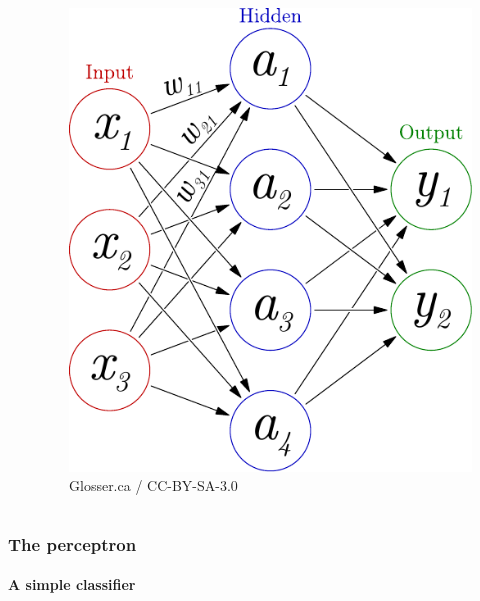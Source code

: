 \documentclass{beamer}
\begin{document}
\begin{frame}
\begin{columns}[T]
\begin{column}{.5\textwidth}
    \end{column}
    \begin{column}{.5\textwidth}
\begin{figure}
 \centering
 \includegraphics[width=\linewidth]{./fig/3-layer_maths.pdf}
  \caption{Glosser.ca / CC-BY-SA-3.0}
\end{figure}
    \end{column}
  \end{columns}
\end{frame}


\begin{frame}
\frametitle{The perceptron}
\framesubtitle{A simple classifier}
 
\end{frame}
\end{document}
